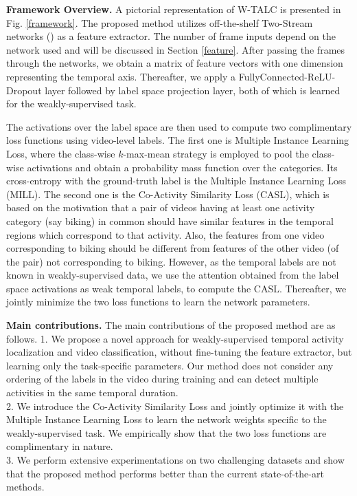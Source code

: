 \documentclass[runningheads]{llncs}
\begin{document}
\textbf{Framework Overview.}
A pictorial representation of W-TALC is presented in Fig. \ref{framework}. The proposed method utilizes off-the-shelf Two-Stream networks (\cite{wang2017untrimmednets,carreira2017quo}) as a feature extractor. The number of frame inputs depend on the network used and will be discussed in Section \ref{feature}. After passing the frames through the networks, we obtain a matrix of feature vectors with one dimension representing the temporal axis. Thereafter, we apply a FullyConnected-ReLU-Dropout layer followed by label space projection layer, both of which is learned for the weakly-supervised task. 

The activations over the label space are then used to compute two complimentary loss functions using video-level labels. The first one is Multiple Instance Learning Loss, where the class-wise $k$-max-mean strategy is employed to pool the class-wise activations and obtain a probability mass function over the categories. Its cross-entropy with the ground-truth label is the Multiple Instance Learning Loss (MILL). The second one is the Co-Activity Similarity Loss (CASL), which is based on the motivation that a pair of videos having at least one activity category (say biking) in common should have similar features in the temporal regions which correspond to that activity. Also, the features from one video corresponding to biking should be different from features of the other video (of the pair) not corresponding to biking. However, as the temporal labels are not known in weakly-supervised data, we use the attention obtained from the label space activations as weak temporal labels, to compute the CASL. Thereafter, we jointly minimize the two loss functions to learn the network parameters. 

\textbf{Main contributions.} The main contributions of the proposed method are as follows. 1. We propose a novel approach for weakly-supervised temporal activity localization and video classification, without fine-tuning the feature extractor, but learning only the task-specific parameters. Our method does not consider any ordering of the labels in the video during training and can detect multiple activities in the same temporal duration.\\
2. We introduce the Co-Activity Similarity Loss and jointly optimize it with the Multiple Instance Learning Loss to learn the network weights specific to the weakly-supervised task. We empirically show that the two loss functions are complimentary in nature. \\
3. We perform extensive experimentations on two challenging datasets and show that the proposed method performs better than the current state-of-the-art methods. 
\end{document}

